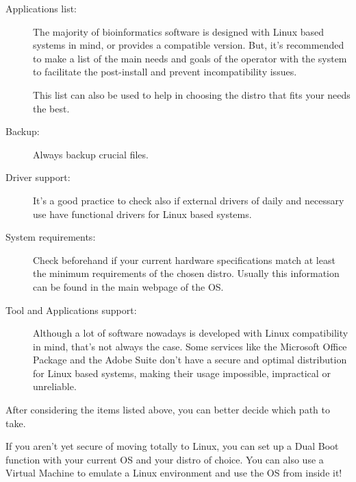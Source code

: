 \documentclass[a4paper,11pt]{article}
\begin{document}
\begin{description}
\item[Applications list:] The majority of bioinformatics software is designed
    with Linux based systems in mind, or provides a compatible version. But,
    it's recommended to make a list of the main needs and goals of the operator
    with the system to facilitate the post-install and prevent incompatibility
    issues.
\begin{tipbox}
This list can also be used to help in choosing the distro that fits your needs
the best.
\end{tipbox}
\item[Backup:] Always backup crucial files.
\item[Driver support:] It's a good practice to check also if external drivers of
    daily and necessary use have functional drivers for Linux based systems.
\item[System requirements:] Check beforehand if your current hardware
    specifications match at least the minimum requirements of the chosen distro.
    Usually this information can be found in the main webpage of the OS.
\item[Tool and Applications support:] Although a lot of software nowadays is
    developed with Linux compatibility in mind, that's not always the case. Some
    services like the Microsoft Office Package and the Adobe Suite don't have
    a secure and optimal distribution for Linux based systems, making their
    usage impossible, impractical or unreliable.
\end{description}
After considering the items listed above, you can better decide which path to
take.
\begin{tipbox}
If you aren't yet secure of moving totally to Linux, you can set up a Dual Boot
function with your current OS and your distro of choice. You can also use
a Virtual Machine to emulate a Linux environment and use the OS from inside it!
\end{tipbox}
\end{document}
